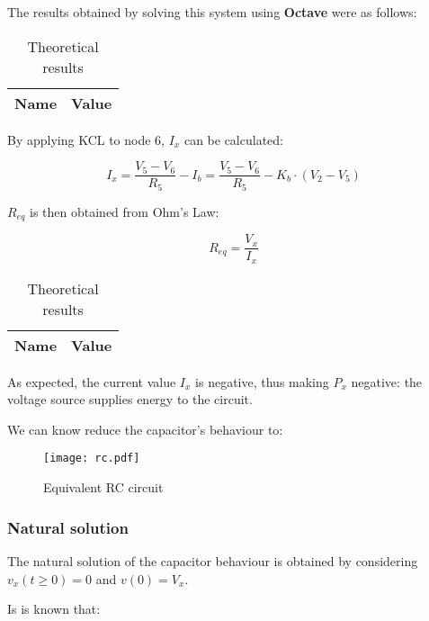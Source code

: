 The results obtained by solving this system using \textbf{Octave} were as follows:

\begin{table}[H]
  \centering
  \begin{tabular}{|c|c|}
    \hline
        {\bf Name} & {\bf Value} \\
        \hline
        \hline
        
        \hline
  \end{tabular}
  \caption{Theoretical results}
\end{table}

By applying KCL to node 6, $I_x$ can be calculated:

\begin{equation}
  I_x = \frac{V_5-V_6}{R_5}-I_b = \frac{V_5-V_6}{R_5} - K_b \cdot (V_2-V_5)
\end{equation}

$R_{eq}$ is then obtained from Ohm's Law:

\begin{equation}
  R_{eq} = \frac{V_x}{I_x}
\end{equation}

\begin{table}[H]
  \centering
  \begin{tabular}{|c|c|}
    \hline
        {\bf Name} & {\bf Value} \\
        \hline
        \hline
        
        \hline
  \end{tabular}
  \caption{Theoretical results}
\end{table}

As expected, the current value $I_x$ is negative, thus making $P_x$ negative: the voltage source supplies energy to the circuit.

We can know reduce the capacitor's behaviour to:

\begin{figure}[H]
  \centering
  \texttt{[image: rc.pdf]}
  \caption{Equivalent RC circuit}
  \label{rc_fig}
\end{figure}


\subsubsection{Natural solution}

The natural solution of the capacitor behaviour is obtained by considering $v_x(t\geq0)=0$ and $v(0)=V_x$.

Is is known that:


